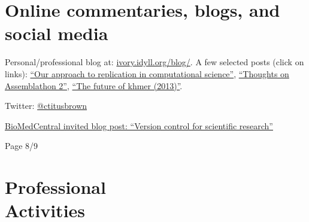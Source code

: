 \documentclass[margin,line]{resume}
\begin{document}
\begin{resume}
\section{\mysidestyle Online commentaries, blogs, and social media}

Personal/professional blog at: \href{http://ivory.idyll.org/blog/}{ivory.idyll.org/blog/}.  A few selected posts (click on links): \href{http://ivory.idyll.org/blog/replication-i.html}{``Our approach to replication in computational science''}, \href{http://ivory.idyll.org/blog/thoughts-on-assemblathon-2.html}{``Thoughts on Assemblathon 2''}, \href{http://ivory.idyll.org/blog/the-future-of-khmer-2013-version.html}{``The future of khmer (2013)''}.

Twitter: \href{http://twitter.com/ctitusbrown}{@ctitusbrown}

\href{http://blogs.biomedcentral.com/bmcblog/2013/02/28/version-control-for-scientific-research/}{BioMedCentral invited blog post: ``Version control for scientific research''}

\vspace{2cm}
{\centerline {Page 8/9}}
\newpage

    \section{\mysidestyle Professional\\Activities}


\end{resume}
\end{document}
